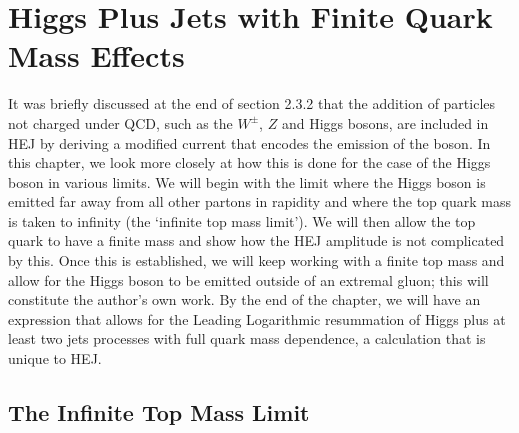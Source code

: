\chapter{Higgs Plus Jets with Finite Quark Mass Effects}

It was briefly discussed at the end of section 2.3.2 that the addition of particles not charged under QCD, such as the $W^\pm$, $Z$ and Higgs bosons, are included in HEJ by deriving a modified current that encodes the emission of the boson. In this chapter, we look more closely at how this is done for the case of the Higgs boson in various limits. We will begin with the limit where the Higgs boson is emitted far away from all other partons in rapidity and where the top quark mass is taken to infinity (the `infinite top mass limit'). We will then allow the top quark to have a finite mass and show how the HEJ amplitude is not complicated by this. Once this is established, we will keep working with a finite top mass and allow for the Higgs boson to be emitted outside of an extremal gluon; this will constitute the author's own work. By the end of the chapter, we will have an expression that allows for the Leading Logarithmic resummation of Higgs plus at least two jets processes with full quark mass dependence, a calculation that is unique to HEJ.   
\section{The Infinite Top Mass Limit}

